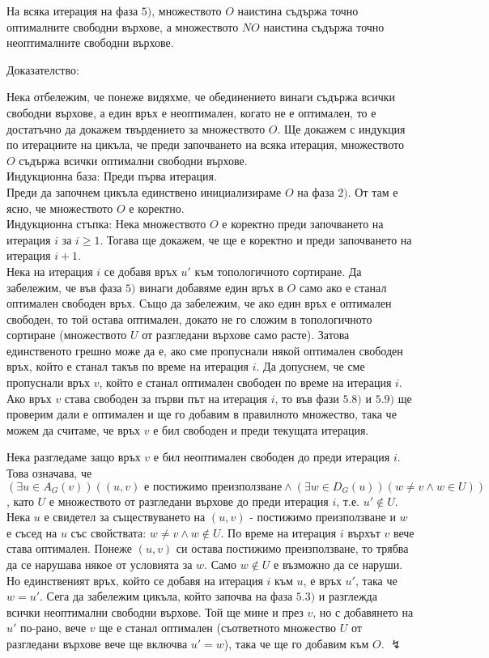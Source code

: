 \documentclass[12pt,twoside,a4paper]{article}
\begin{document}
	\begin{statement} На всяка итерация на фаза $5)$, множеството $O$ наистина съдържа точно оптималните свободни върхове, а множеството $NO$ наистина съдържа точно неоптималните свободни върхове.
		
		\noindent Доказателство:
		
		Нека отбележим, че понеже видяхме, че обединението винаги съдържа всички свободни върхове, а един връх е неоптимален, когато не е оптимален, то е достатъчно да докажем твърдението за множеството $O$. Ще докажем с индукция по итерациите на цикъла, че преди започването на всяка итерация, множеството $O$ съдържа всички оптимални свободни върхове.\\
		\indent Индукционна база: Преди първа итерация.\\
		Преди да започнем цикъла единствено инициализираме $O$ на фаза $2)$. От там е ясно, че множеството $O$ е коректно.\\
		\indent Индукционна стъпка: Нека множеството $O$ е коректно преди започването на итерация $i$ за $i \ge 1$. Тогава ще докажем, че ще е коректно и преди започването на итерация $i+1$.\\
		Нека на итерация $i$ се добавя връх $u'$ към топологичното сортиране. Да забележим, че във фаза $5)$ винаги добавяме един връх в $O$ само ако е станал оптимален свободен връх. Също да забележим, че ако един връх е оптимален свободен, то той остава оптимален, докато не го сложим в топологичното сортиране (множеството $U$ от разгледани върхове само расте). Затова единственото грешно може да е, ако сме пропуснали някой оптимален свободен връх, който е станал такъв по време на итерация $i$. Да допуснем, че сме пропуснали връх $v$, който е станал оптимален свободен по време на итерация $i$. Ако връх $v$ става свободен за първи път на итерация $i$, то във фази $5.8)$ и $5.9)$ ще проверим дали е оптимален и ще го добавим в правилното множество, така че можем да считаме, че връх $v$ е бил свободен и преди текущата итерация.
		
		Нека разгледаме защо връх $v$ е бил неоптимален свободен до преди итерация $i$. Това означава, че $(\exists u \in A_G(v))((u,v)\text{ е постижимо преизползване} \land (\exists w \in D_G(u))(w \neq v \land w \in U))$, като $U$ е множеството от разгледани върхове до преди итерация $i$, т.е. $u' \notin U$. Нека $u$ е свидетел за съществуването на $(u,v)$ - постижимо преизползване и $w$ е съсед на $u$ със свойствата: $w \neq v \land w \notin U$. По време на итерация $i$ върхът $v$ вече става оптимален. Понеже $(u,v)$ си остава постижимо преизползване, то трябва да се нарушава някое от условията за $w$. Само $w \notin U$ е възможно да се наруши. Но единственият връх, който се добавя на итерация $i$ към $u$, е връх $u'$, така че $w=u'$. Сега да забележим цикъла, който започва на фаза $5.3)$ и разглежда всички неоптимални свободни върхове. Той ще мине и през $v$, но с добавянето на $u'$ по-рано, вече $v$ ще е станал оптимален (съответното множество $U$ от разгледани върхове вече ще включва $u'=w$), така че ще го добавим към $O$. $\lightning$
	\end{statement}
	
\end{document}
